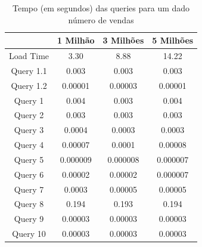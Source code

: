 \documentclass[a4paper]{report}
\begin{document}
\begin{table}[H]
    \begin{center}
        \begin{tabular}{| c | c | c | c |}
            \hline
            & 1 Milhão & 3 Milhões & 5 Milhões \\
            \hline
            Load Time & 3.30 & 8.88 & 14.22 \\
            \hline
            Query 1.1 & 0.003 & 0.003 & 0.003 \\
            \hline
            Query 1.2 & 0.00001 & 0.00003 & 0.00001 \\
            \hline
            Query 1 & 0.004 & 0.003 & 0.004 \\
            \hline
            Query 2 & 0.003 & 0.003 & 0.003 \\
            \hline
            Query 3 & 0.0004 & 0.0003 & 0.0003 \\
            \hline
            Query 4 & 0.00007 & 0.0001 & 0.00008 \\
            \hline
            Query 5 & 0.000009 & 0.000008 & 0.000007 \\
            \hline
            Query 6 & 0.00002 & 0.00002 & 0.000007 \\
            \hline
            Query 7 & 0.0003 & 0.00005 & 0.00005 \\
            \hline
            Query 8 & 0.194 & 0.193 & 0.194 \\
            \hline
            Query 9 & 0.00003 & 0.00003 & 0.00003 \\
            \hline
            Query 10 & 0.00003 & 0.00003 & 0.00003 \\
            \hline

        \end{tabular}
        \caption{Tempo (em segundos) das queries para um dado número de vendas}
        \label{tab:benches}
    \end{center}
\end{table}
\end{document}
